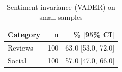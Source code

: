 \begin{table}[H]
  \centering
  \caption{Sentiment invariance (VADER) on small samples}
  \small
  \begin{tabular}{lrr}
    \toprule
    Category & n & \% [95\% CI] \\
    \midrule
    Reviews & 100 & 63.0 [53.0, 72.0] \\
    Social & 100 & 57.0 [47.0, 66.0] \\
    \bottomrule
  \end{tabular}
\end{table}
